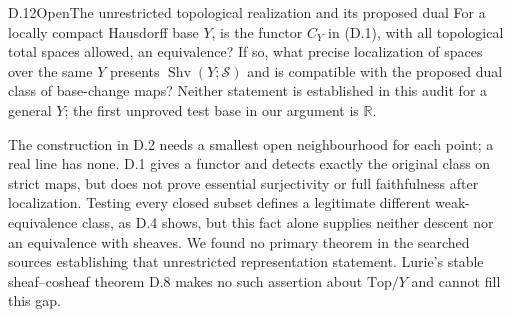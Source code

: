 \begin{claim}{D.12}{Open}{The unrestricted topological realization and its proposed dual}
For a locally compact Hausdorff base $Y$, is the functor $C_Y$ in
(D.1), with all topological total spaces allowed, an equivalence?
If so, what precise localization of spaces over the same $Y$
presents $\operatorname{Shv}(Y;\mathcal S)$ and is compatible with
the proposed dual class of base-change maps? Neither statement is
established in this audit for a general $Y$; the first unproved
test base in our argument is $\mathbb R$.
\end{claim}
The construction in D.2 needs a smallest open neighbourhood for each
point; a real line has none. D.1 gives a functor and detects exactly
the original class on strict maps, but does not prove essential
surjectivity or full faithfulness after localization. Testing every
closed subset defines a legitimate different weak-equivalence
class, as D.4 shows, but this fact alone supplies neither descent
nor an equivalence with sheaves. We found no primary theorem in the
searched sources establishing that unrestricted representation
statement. Lurie's stable sheaf--cosheaf theorem D.8 makes no such
assertion about $\mathrm{Top}/Y$ and cannot fill this gap.

